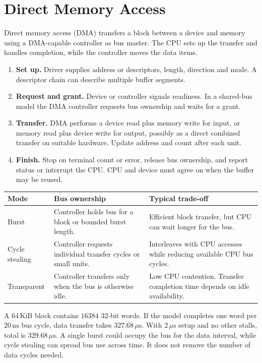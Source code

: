 \documentclass[12pt,a4paper]{article}
\begin{document}
\section{Direct Memory Access}
\begin{tcolorbox}[defbox,title={Direct memory access}]
Direct memory access (DMA) transfers a block between a device and memory using a DMA-capable controller as bus master. The CPU sets up the transfer and handles completion, while the controller moves the data items.
\end{tcolorbox}
\begin{enumerate}[leftmargin=*,itemsep=3pt]
\item \textbf{Set up.} Driver supplies address or descriptors, length, direction and mode. A descriptor chain can describe multiple buffer segments.
\item \textbf{Request and grant.} Device or controller signals readiness. In a shared-bus model the DMA controller requests bus ownership and waits for a grant.
\item \textbf{Transfer.} DMA performs a device read plus memory write for input, or memory read plus device write for output, possibly as a direct combined transfer on suitable hardware. Update address and count after each unit.
\item \textbf{Finish.} Stop on terminal count or error, release bus ownership, and report status or interrupt the CPU. CPU and device must agree on when the buffer may be reused.
\end{enumerate}
\par\vspace{6pt}\noindent
\begin{tabularx}{\linewidth}{|B{3.05cm}|Y|Y|}\hline
Mode & Bus ownership & Typical trade-off \\ \hline
Burst & Controller holds bus for a block or bounded burst length. & Efficient block transfer, but CPU can wait longer for the bus. \\ \hline
Cycle stealing & Controller requests individual transfer cycles or small units. & Interleaves with CPU accesses while reducing available CPU bus cycles. \\ \hline
Transparent & Controller transfers only when the bus is otherwise idle. & Low CPU contention. Transfer completion time depends on idle availability. \\ \hline
\end{tabularx}

\begin{tcolorbox}[examplebox,title={DMA transfer time and contention}]
A $64\,\mathrm{KiB}$ block contains $16384$ 32-bit words. If the model completes one word per $20\,\mathrm{ns}$ bus cycle, data transfer takes $327.68\,\mu\mathrm s$. With $2\,\mu\mathrm s$ setup and no other stalls, total is $329.68\,\mu\mathrm s$. A single burst could occupy the bus for the data interval, while cycle stealing can spread bus use across time. It does not remove the number of data cycles needed.
\end{tcolorbox}
\end{document}
